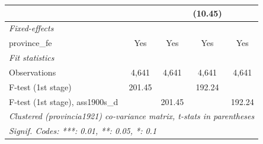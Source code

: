 \begin{table}[htbp]
\begin{tabular}{lcccc}
                                       &                       &                        & (10.45)               &   \\   
      \midrule
      \emph{Fixed-effects}\\
      province\_fe                     & Yes                   & Yes                    & Yes                   & Yes\\  
      \midrule
      \emph{Fit statistics}\\
      Observations                     & 4,641                 & 4,641                  & 4,641                 & 4,641\\  
      F-test (1st stage)               & 201.45                &                        & 192.24                & \\  
      F-test (1st stage), ass1900s\_d  &                       & 201.45                 &                       & 192.24\\  
      \midrule \midrule
      \multicolumn{5}{l}{\emph{Clustered (provincia1921) co-variance matrix, t-stats in parentheses}}\\
      \multicolumn{5}{l}{\emph{Signif. Codes: ***: 0.01, **: 0.05, *: 0.1}}\\
   \end{tabular}
\end{table}


